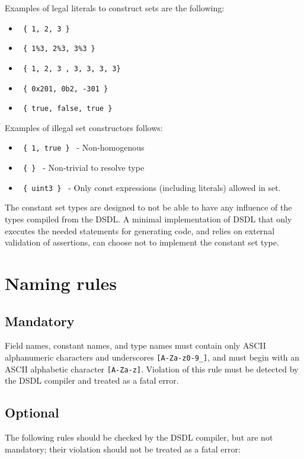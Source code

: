Examples of legal literals to construct sets are the following:
\begin{itemize}
    \item \texttt{ \{ 1, 2, 3 \} }
    \item \texttt{ \{ 1\%3, 2\%3, 3\%3 \} }
    \item \texttt{ \{ 1, 2, 3 , 3, 3, 3, 3\} }
    \item \texttt{ \{ 0x201, 0b2, -301 \} }
    \item \texttt{ \{ true, false, true \} }
\end{itemize}

Examples of illegal set constructors follows:
\begin{itemize}
    \item \texttt{ \{ 1, true \} } - Non-homogenous
    \item \texttt{ \{ \} } - Non-trivial to resolve type
    \item \texttt{ \{ uint3 \} } - Only const expressions (including literals) allowed in set.
\end{itemize}

The constant set types are designed to not be able to have any influence of the types compiled from the DSDL.
A minimal implementation of DSDL that only executes the needed statements for generating code,
and relies on external validation of assertions, can choose not to implement the constant set type.

\section{Naming rules}\label{sec:dsdl_naming_rules}

\subsection{Mandatory}

Field names, constant names, and type names must contain only ASCII alphanumeric characters and underscores
\verb|[A-Za-z0-9_]|,
and must begin with an ASCII alphabetic character \verb|[A-Za-z]|.
Violation of this rule must be detected by the DSDL compiler and treated as a fatal error.

\subsection{Optional}

The following rules should be checked by the DSDL compiler, but are not mandatory;
their violation should not be treated as a fatal error:

